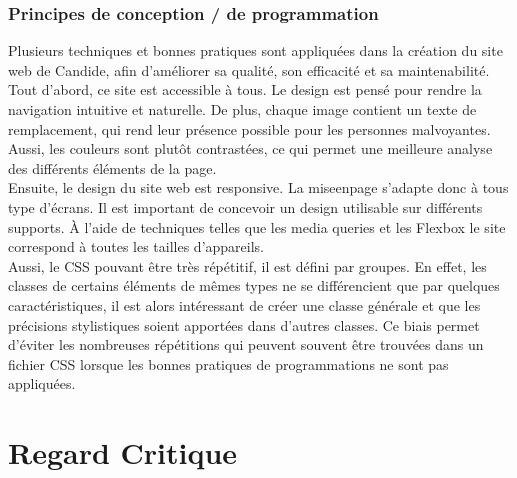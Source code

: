 \documentclass[a4,10pt,french]{sphinxmanual}
\begin{document}
\subsection{Principes de conception / de programmation}
\label{\detokenize{chapitre-02:principes-de-conception-de-programmation}}
\sphinxAtStartPar
Plusieurs techniques et bonnes pratiques sont appliquées dans la création du site web de Candide, afin d’améliorer sa qualité, son efficacité et sa maintenabilité.\\
Tout d’abord, ce site est accessible à tous. Le design est pensé pour rendre la navigation intuitive et naturelle. De plus, chaque image contient un texte de remplacement, qui rend leur présence possible pour les personnes malvoyantes. Aussi, les couleurs sont plutôt contrastées, ce qui permet une meilleure analyse des différents éléments de la page.\\
Ensuite, le design du site web est responsive. La mise\sphinxhyphen{}en\sphinxhyphen{}page s’adapte donc à tous type d’écrans. Il est important de concevoir un design utilisable sur différents supports. À l’aide de techniques telles que les media queries et les Flex\sphinxhyphen{}box le site correspond à toutes les tailles d’appareils.\\
Aussi, le CSS pouvant être très répétitif, il est défini par groupes. En effet, les classes de certains éléments de mêmes types ne se différencient que par quelques caractéristiques, il est alors intéressant de créer une classe générale et que les précisions stylistiques soient apportées dans d’autres classes. Ce biais permet d’éviter les nombreuses répétitions qui peuvent souvent être trouvées dans un fichier CSS lorsque les bonnes pratiques de programmations ne sont pas appliquées.


\chapter{Regard Critique}
\label{\detokenize{chapitre-03:regard-critique}}\label{\detokenize{chapitre-03::doc}}
\end{document}
